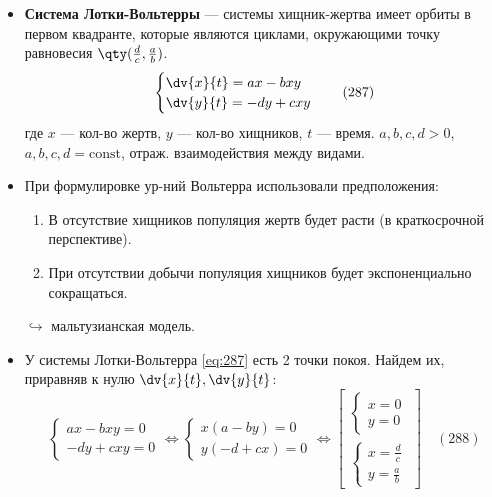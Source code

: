 \begin{itemize}
	\item \textbf{Система Лотки-Вольтерры} — системы хищник-жертва имеет орбиты в первом квадранте, которые являются циклами, окружающими точку равновесия $\qty(\frac{d}{c}, \frac{a}{b})$.
	\begin{equation} \label{eq:287}
		\begin{cases}
			\dv{x}{t} = ax - bxy \\
			\dv{y}{t} = -dy + cxy
		\end{cases} \quad (287)
	\end{equation}
	где $x$ — кол-во жертв, $y$ — кол-во хищников, $t$ — время. $a,b,c,d > 0$, $a,b,c,d = \text{const}$, отраж. взаимодействия между видами.
	
	\item При формулировке ур-ний Вольтерра использовали предположения:
	\begin{enumerate}
		\item[(1)] В отсутствие хищников популяция жертв будет расти (в краткосрочной перспективе).
		\item[(2)] При отсутствии добычи популяция хищников будет экспоненциально сокращаться.
	\end{enumerate}
	$\hookrightarrow$ мальтузианская модель.
	
	\item У системы Лотки-Вольтерра \eqref{eq:287} есть 2 точки покоя. Найдем их, приравняв к нулю $\dv{x}{t}, \dv{y}{t}$:
	\begin{equation} \label{eq:288}
		\begin{cases}
			ax - bxy = 0 \\
			-dy + cxy = 0
		\end{cases} \iff
		\begin{cases}
			x(a - by) = 0 \\
			y(-d + cx) = 0
		\end{cases} \iff
		\begin{bmatrix}
			\begin{cases} x = 0 \\ y = 0 \end{cases} \\
			\begin{cases} x = \frac{d}{c} \\ y = \frac{a}{b} \end{cases}
		\end{bmatrix} \quad (288)
	\end{equation}
\end{itemize}

